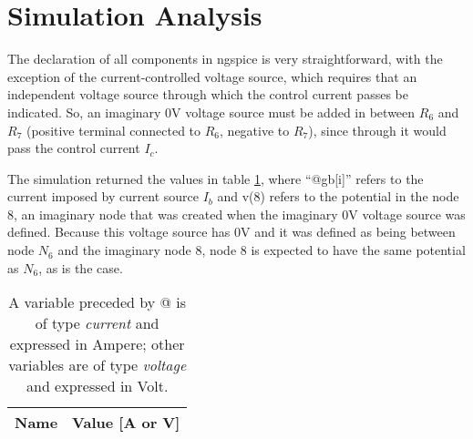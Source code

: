 \section{Simulation Analysis}
\label{sec:simulation}


\par
The declaration of all components in ngspice is very straightforward, with the exception of the current-controlled voltage source, which requires that an independent voltage source through which the control current passes be indicated. So, an imaginary 0V voltage source must be added in between $R_6$ and $R_7$ (positive terminal connected to $R_6$, negative to $R_7$), since through it would pass the control current $I_c$.
\par
The simulation returned the values in table \ref{tab:sim}, where ``@gb[i]'' refers to the current imposed by current source $I_b$ and v(8) refers to the potential in the node 8, an imaginary node that was created when the imaginary 0V voltage source was defined. Because this voltage source has 0V and it was defined as being between node $N_6$ and the imaginary node 8, node 8 is expected to have the same potential as $N_6$, as is the case.
\par

\begin{table}[h]
  \centering
  \begin{tabular}{|l|r|}
    \hline    
    {\bf Name} & {\bf Value [A or V]} \\ \hline
    
  \end{tabular}
  \caption{A variable preceded by @ is of type {\em current} and expressed in Ampere; other variables are of type {\it voltage} and expressed in Volt.}
  \label{tab:sim}
\end{table}




